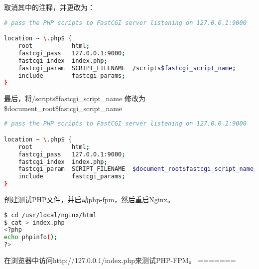 取消其中的注释，并更改为：

\begin{lstlisting}[language=bash]
# pass the PHP scripts to FastCGI server listening on 127.0.0.1:9000

location ~ \.php$ {
    root           html;
    fastcgi_pass   127.0.0.1:9000;
    fastcgi_index  index.php;
    fastcgi_param  SCRIPT_FILENAME  /scripts$fastcgi_script_name;
    include        fastcgi_params;
}
\end{lstlisting}

最后，将/scripts\$fastcgi\_script\_name 修改为 \$document\_root\$fastcgi\_script\_name

\begin{lstlisting}[language=bash]
# pass the PHP scripts to FastCGI server listening on 127.0.0.1:9000

location ~ \.php$ {
    root           html;
    fastcgi_pass   127.0.0.1:9000;
    fastcgi_index  index.php;
    fastcgi_param  SCRIPT_FILENAME  $document_root$fastcgi_script_name;
    include        fastcgi_params;
}
\end{lstlisting}

创建测试PHP文件，并启动php-fpm，然后重启Nginx。


\begin{lstlisting}[language=bash]
$ cd /usr/local/nginx/html
$ cat > index.php
<?php
echo phpinfo();
?>

\end{lstlisting}

在浏览器中访问http://127.0.0.1/index.php来测试PHP-FPM。
=======

